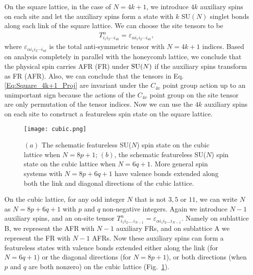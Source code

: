 \documentclass[aps,prb,twocolumn,superscriptaddress,showpacs]{revtex4}
\newcommand{\SU}{\mathrm{SU}}
\newcommand{\beqn}{\begin{eqnarray}}
\newcommand{\eeqn}{\end{eqnarray}}
\def\VBScbO{\text{VBS}_{\text{cb,oct}}}
\def\VBScbH{\text{VBS}_{\text{cb,hex}}}
\def\SU{{\rm SU}}
\begin{document}
On the square lattice, in the case of $N = 4k+1$, we introduce
$4k$ auxiliary spins on each site and let the auxiliary spins form
a state with $k$ SU$(N)$ singlet bonds along each link of the
square lattice. We can choose the site tensors to be \beqn
T^{\alpha}_{i_1 i_2 \cdots i_{4k}} = \varepsilon_{\alpha i_1 i_2
\cdots i_{4k}}, \label{Eq:Square_4k+1_Proj} \eeqn where
$\varepsilon_{\alpha i_1 i_2 \cdots i_{4k}}$ is the total
anti-symmetric tensor with $N=4k+1$ indices. Based on analysis
completely in parallel with the honeycomb lattice, we conclude
that the physical spin carries AFR (FR) under $\SU(N)$ if the
auxiliary spins transform as FR (AFR). Also, we can conclude that
the tensors in Eq. \ref{Eq:Square_4k+1_Proj} are invariant under
the $C_{4v}$ point group action up to an unimportant sign because
the actions of the $C_{4v}$ point group on the site tensor are
only permutation of the tensor indices. Now we can use the $4k$
auxiliary spins on each site to construct a featureless spin state
on the square lattice.

\begin{figure}[tbp]
\begin{center}
\texttt{[image: cubic.png]}
\caption{$(a)$ The schematic featureless SU($N$) spin state on the
cubic lattice when $N = 8p +1$; $(b)$, the schematic featureless
SU($N$) spin state on the cubic lattice when $N = 6q + 1$. More
general spin systems with $N = 8 p + 6 q + 1$ have valence bonds
extended along both the link and diagonal directions of the cubic
lattice.} \label{cubic}
\end{center}
\end{figure}

On the cubic lattice, for any odd integer $N$ that is not $3,5$ or
$11$, we can write $N$ as $N=8 p + 6 q + 1$ with $p$ and $q$
non-negative integers.
Again we introduce $N-1$ auxiliary spins, and an on-site tensor
$T^{\alpha}_{i_1 i_2 ....i_{N-1}} = \varepsilon_{\alpha i_1 i_2
... i_{N-1}}$. Namely on sublattice B, we represent the AFR with
$N-1$ auxiliary FRs, and on sublattice A we represent the FR with
$N-1$ AFRs. Now these auxiliary spins can form a featureless
states with valence bonds extended either along the link (for $N =
6q + 1$) or the diagonal directions (for $N = 8p + 1$), or both
directions (when $p$ and $q$ are both nonzero) on the cubic
lattice (Fig.~\ref{cubic}).
\end{document}
